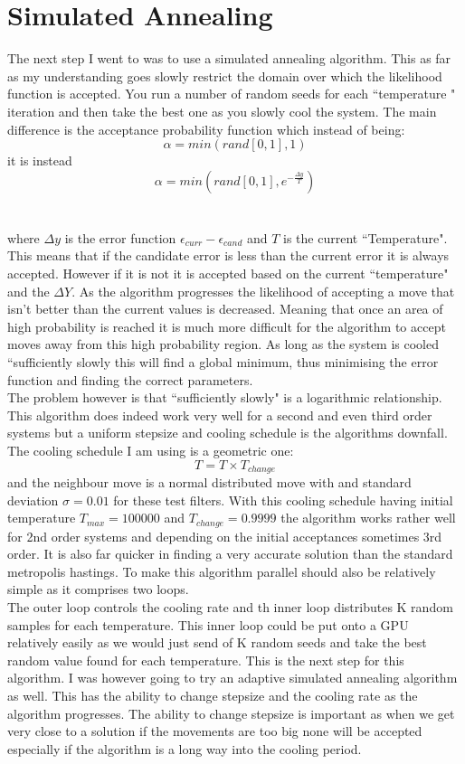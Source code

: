 \documentclass[12pt]{article}
\begin{document}
\section{Simulated Annealing }
The next step I went to was to use a simulated annealing algorithm. This as far as my understanding goes slowly restrict the domain over which the likelihood function is accepted. You run a number of random seeds for each ``temperature " iteration and then take the best one as you slowly cool the system. The main difference is the acceptance probability function which instead of being:
$$\alpha = min(rand[0,1],1)$$
it is instead 
$$\alpha = min(rand[0,1],e^{-\frac{\Delta y}{T}})$$
\\\\where $\Delta y$ is the error function $\epsilon_{curr} -\epsilon_{cand}$ and $T$ is the current ``Temperature". This means that if the candidate error is less than the current error it is always accepted. However if it is not it is accepted based on the current ``temperature" and the $\Delta Y$. As the algorithm progresses the likelihood of accepting a move that isn't better than the current values is decreased. Meaning that once an area of high probability is reached it is much more difficult for the algorithm to accept moves away from this high probability region. As long as the system is cooled ``sufficiently slowly this will find a global minimum, thus minimising the error function and finding the correct parameters.\\

The problem however is that ``sufficiently slowly" is a logarithmic relationship. This algorithm does indeed work very well for a second and even third order systems but a uniform stepsize and cooling schedule is the algorithms downfall. The cooling schedule I am using is a geometric one:
$$T = T \times T_{change}$$
and the neighbour move is a normal distributed move with and standard deviation $\sigma = 0.01$ for these test filters. With this cooling schedule having initial temperature $T_{max} = 100000$ and $T_{change} = 0.9999$ the algorithm works rather well for 2nd order systems and depending on the initial acceptances sometimes 3rd order. It is also far quicker in finding a very accurate solution than the standard metropolis hastings. To make this algorithm parallel should also be relatively simple as it comprises two loops.\\

The outer loop controls the cooling rate and th inner loop distributes K random samples for each temperature. This inner loop could be put onto a GPU relatively easily as we would just send of K random seeds and take the best random value found for each temperature. This is the next step for this algorithm. I was however going to try an adaptive simulated annealing algorithm as well. This has the ability to change stepsize and the cooling rate as the algorithm progresses. The ability to change stepsize is important as when we get very close to a solution if the movements are too big none will be accepted especially if the algorithm is a long way into the cooling period.
\\
\end{document}
